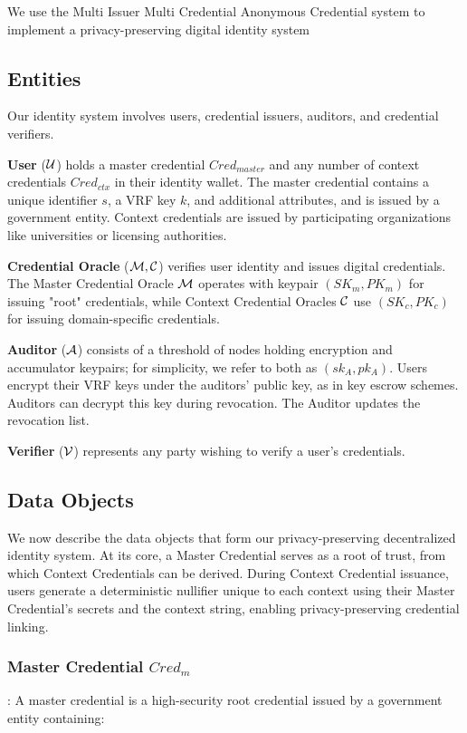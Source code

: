 {We use the Multi Issuer Multi Credential Anonymous Credential system to implement a privacy-preserving digital identity system

\subsection{Entities}
Our identity system involves users, credential issuers, auditors, and credential verifiers.

\noindent \textbf{User} ($\mathcal{U}$) holds a master credential $Cred_{master}$ and any number of context credentials $Cred_{ctx}$ in their identity wallet. The master credential contains a unique identifier $s$, a VRF key $k$, and additional attributes, and is issued by a government entity. Context credentials are issued by participating organizations like universities or licensing authorities.

\noindent \textbf{Credential Oracle} ($\mathcal{M}, \mathcal{C}$) verifies user identity and issues digital credentials. The Master Credential Oracle $\mathcal{M}$ operates with keypair $(SK_{m}, PK_{m})$ for issuing "root" credentials, while Context Credential Oracles $\mathcal{C}$ use $(SK_{c}, PK_{c})$ for issuing domain-specific credentials.

\noindent \textbf{Auditor} ($\mathcal{A}$) consists of a threshold of nodes holding encryption and accumulator keypairs; for simplicity, we refer to both as $(sk_A, pk_A)$. Users encrypt their VRF keys under the auditors' public key, as in key escrow schemes. Auditors can decrypt this key during revocation. The Auditor updates the revocation list. 

\noindent \textbf{Verifier} ($\mathcal{V}$) represents any party wishing to verify a user's credentials.

\subsection{Data Objects}

We now describe the data objects that form our privacy-preserving decentralized identity system. At its core, a Master Credential serves as a root of trust, from which Context Credentials can be derived. During Context Credential issuance, users generate a deterministic nullifier unique to each context using their Master Credential's secrets and the context string, enabling privacy-preserving credential linking.

\subsubsection{Master Credential $Cred_m$}: 
A master credential is a high-security root credential issued by a government entity containing:

}
